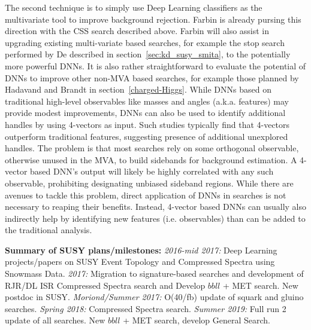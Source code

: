 The second technique is to simply use Deep Learning classifiers as the
multivariate tool to improve background rejection. Farbin is already
pursing this direction with the CSS search described above.  Farbin
will also assist in upgrading existing multi-variate based searches,
for example the stop search performed by De described in
section~\ref{sec:kd_susy_smita}, to the potentially more powerful
DNNs. It is also rather straightforward to evaluate the potential of
DNNs to improve other non-MVA based searches, for example those
planned by Hadavand and Brandt in section~\ref{charged-Higgs}. While
DNNs based on traditional high-level observables like masses and
angles (a.k.a. features) may provide modest improvements, DNNs can
also be used to identify additional handles by using 4-vectors as
input. Such studies typically find that 4-vectors outperform
traditional features, suggesting presence of additional unexplored
handles. The problem is that most searches rely on some orthogonal
observable, otherwise unused in the MVA, to build sidebands for
background estimation. A 4-vector based DNN's output will likely be
highly correlated with any such observable, prohibiting designating
unbiased sideband regions. While there are avenues to tackle this
problem, direct application of DNNs in searches is not necessary to
reaping their benefits. Instead, 4-vector based DNNs can usually also
indirectly help by identifying new features (i.e. observables) than
can be added to the traditional analysis.

{\bf Summary of SUSY plans/milestones:} {\em 2016-mid 2017:} Deep Learning
projects/papers on SUSY Event Topology and Compressed Spectra using
Snowmass Data. {\em 2017:} Migration to signature-based searches and
development of RJR/DL ISR Compressed Spectra search and Develop $bbll$
+ MET search.  New postdoc in SUSY. {\em Moriond/Summer 2017:} O(40/fb)
update of squark and gluino searches. {\em Spring 2018:} Compressed Spectra
search. {\em Summer 2019:} Full run 2 update of all searches. New $bbll$ +
MET search, develop General Search.



